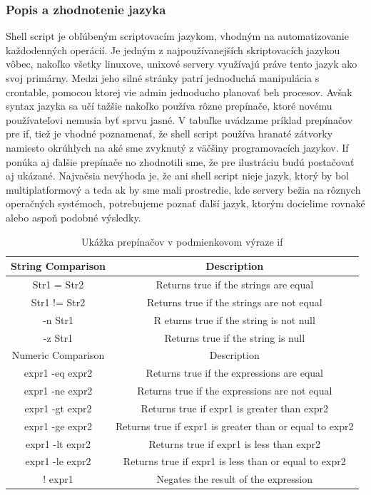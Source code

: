 \subsubsection{Popis a zhodnotenie jazyka}
\noindent
Shell script je obľúbeným scriptovacím jazykom, vhodným na automatizovanie každodenných operácií. Je jedným z najpoužívanejších skriptovacích jazykou vôbec, nakoľko všetky linuxove, unixové servery využívajú práve tento jazyk ako svoj primárny.
Medzi jeho silné stránky patrí jednoduchá manipulácia s crontable, pomocou ktorej vie admin jednoducho planovať beh procesov.
Avšak syntax jazyka sa učí tažšie nakoľko používa rôzne prepínače, ktoré novému používateľovi nemusia byť sprvu jasné.
V tabuľke uvádzame príklad prepínačov pre if, tiež je vhodné poznamenať, že shell script používa hranaté zátvorky namiesto okrúhlych na aké sme zvyknutý z väčšiny programovacích jazykov. If ponúka aj ďalšie prepínače no zhodnotili sme, že pre ilustráciu budú postačovať aj ukázané.
Najvačsia nevýhoda je, že ani shell script nieje jazyk, ktorý by bol multiplatformový a teda ak by sme mali prostredie, kde servery bežia na rôznych operačných systémoch, potrebujeme poznať ďalší jazyk, ktorým docielime rovnaké alebo aspoň podobné výsledky.
\newline
\begin{table}[h!]
	\centering
	\begin{tabular}{| c | c | }
		\hline
		String Comparison	&Description\\
		\hline
		Str1 = Str2	& Returns true if the strings are equal\\ 
		\hline
		Str1 != Str2 &	Returns true if the strings are not equal\\ 
		\hline
		-n Str1	 &R eturns true if the string is not null\\ 
		\hline
		-z Str1	& Returns true if the string is null\\
		\hline
		\hline
		Numeric Comparison	&Description\\
		\hline
		expr1 -eq expr2	& Returns true if the expressions are equal\\
		\hline
		expr1 -ne expr2	& Returns true if the expressions are not equal\\
		\hline
		expr1 -gt expr2	& Returns true if expr1 is greater than expr2\\
		\hline
		expr1 -ge expr2	& Returns true if expr1 is greater than or equal to expr2\\
		\hline
		expr1 -lt expr2	& Returns true if expr1 is less than expr2\\
		\hline
		expr1 -le expr2	& Returns true if expr1 is less than or equal to expr2\\
		\hline
		! expr1	& Negates the result of the expression\\
	    \hline
	\end{tabular}
\caption{Ukážka prepínačov v podmienkovom výraze if}
\label{table:1}
\end{table}
\newpage

